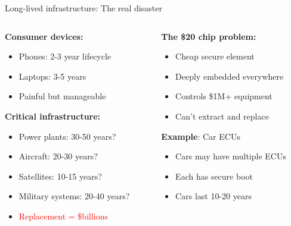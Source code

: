 \documentclass[aspectratio=169, lualatex, handout]{beamer}
\begin{document}
\begin{frame}{Long-lived infrastructure: The real disaster}
	\begin{columns}[c]
		\begin{column}{0.55\textwidth}
			\textbf{Consumer devices:}
			\begin{itemize}
				\item Phones: 2-3 year lifecycle
				\item Laptops: 3-5 years
				\item \textcolor{green!70!black}{Painful but manageable}
			\end{itemize}
			\vspace{3mm}
			\textbf{Critical infrastructure:}
			\begin{itemize}
				\item Power plants: 30-50 years?
				\item Aircraft: 20-30 years?
				\item Satellites: 10-15 years?
				\item Military systems: 20-40 years?
				\item \textcolor{red}{Replacement = \$billions}
			\end{itemize}
		\end{column}
		\begin{column}{0.45\textwidth}
			\textbf{The \$20 chip problem:}
			\begin{itemize}
				\item Cheap secure element
				\item Deeply embedded everywhere
				\item Controls \$1M+ equipment
				\item Can't extract and replace
			\end{itemize}
			\vspace{3mm}
			\textbf{Example}: Car ECUs
			\begin{itemize}
				\item Cars may have multiple ECUs
				\item Each has secure boot
				\item Cars last 10-20 years
			\end{itemize}
		\end{column}
	\end{columns}
\end{frame}
\end{document}
